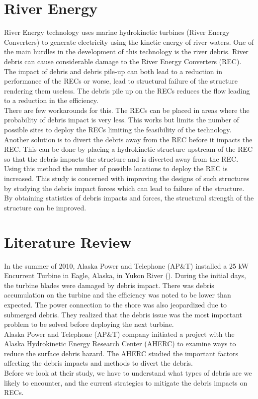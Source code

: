 \section{River Energy}
River Energy technology uses marine hydrokinetic turbines (River Energy Converters) to generate electricity using the kinetic energy of river waters. One of the main hurdles in the development of this technology is the river debris. River debris can cause considerable damage to the River Energy Converters (REC). The impact of debris and debris pile-up can both lead to a reduction in performance of the RECs or worse, lead to structural failure of the structure rendering them useless. The debris pile up on the RECs reduces the flow leading to a reduction in the efficiency.\\
There are few workarounds for this. The RECs can be placed in areas where the probability of debris impact is very less. This works but limits the number of possible sites to deploy the RECs limiting the feasibility of the technology.  Another solution is to divert the debris away from the REC before it impacts the REC. This can be done by placing a hydrokinetic structure upstream of the REC so that the debris impacts the structure and is diverted away from the REC. Using this method the number of possible locations to deploy the REC is increased. This study is concerned with improving the designs of such structures by studying the debris impact forces which can lead to failure of the structure. By obtaining statistics of debris impacts and forces, the structural strength of the structure can be improved.

\section{Literature Review}
In the summer of 2010, Alaska Power and Telephone (AP\&T) installed a 25 kW Encurrent Turbine in Eagle, Alaska, in Yukon River (\cite{Reference1}). During the initial days, the turbine blades were damaged by debris impact. There was debris accumulation on the turbine and the efficiency was noted to be lower than expected. The power connection to the shore was also jeopardized due to submerged debris. They realized that the debris issue was the most important problem to be solved before deploying the next turbine.\\
Alaska Power and Telephone (AP\&T) company initiated a project with the Alaska Hydrokinetic Energy Research Center (AHERC) to examine ways to reduce the surface debris hazard. The AHERC studied the important factors affecting the debris impacts and methods to divert the debris.\\
Before we look at their study, we have to understand what types of debris are we likely to encounter, and the current strategies to mitigate the debris impacts on RECs.

